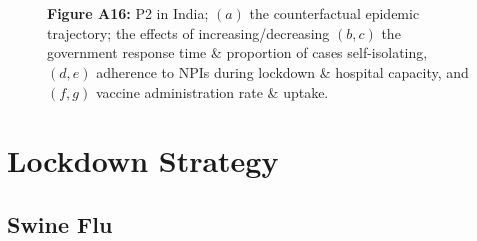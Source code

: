 \documentclass[paper=a4,fontsize=11pt]{article}
\begin{document}
\begin{figure}[!h]
  \\
  \hspace{1.76cm}
  \\
  \caption*{\textbf{Figure A16:} P2 in India; $(a)$ the counterfactual epidemic trajectory; the effects of increasing/decreasing $(b,c)$ the government response time \& proportion of cases self-isolating, $(d,e)$ adherence to NPIs during lockdown \& hospital capacity, and $(f,g)$ vaccine administration rate \& uptake.}
\end{figure}


\section{Lockdown Strategy}
\newpage


\subsection{Swine Flu}
\end{document}
